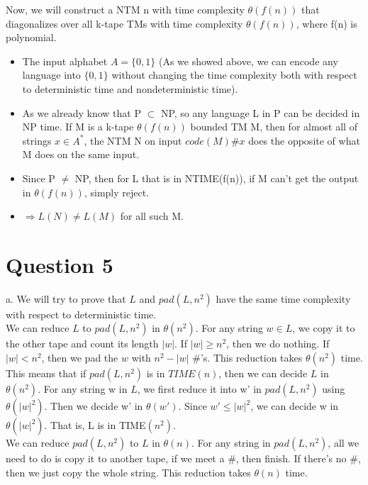\documentclass[12pt]{article}
\begin{document}
Now, we will construct a NTM n with time complexity $\theta (f(n))$ that
diagonalizes over all k-tape TMs with time complexity $\theta
(f(n))$, where f(n) is polynomial.

\begin{itemize}
\item The input alphabet $A = \{ 0,1 \}$ (As we showed above, we can
  encode any language into $\{ 0,1 \}$ without changing the time
  complexity both with respect to deterministic time and
  nondeterministic time).
\item As we already know that P $\subset$ NP, so any language L in P
  can be decided in NP time. If M is a k-tape $\theta (f(n))$ bounded
  TM M, then for almost all of strings $x \in A^*$, the NTM N on input
  $code(M)\#x$ does the opposite of what M does on the same input.
\item Since P $\ne$ NP, then for L that is in NTIME(f(n)), if M can't
  get the output in $\theta (f(n))$, simply reject.
\item $\Rightarrow L(N) \ne L(M)$ for all such M.
\end{itemize}

\section*{Question 5}

a. We will try to prove that $L$ and $pad(L, n^2)$ have the same time
complexity with respect to deterministic time. \\

We can reduce $L$ to $pad(L, n^2)$ in $\theta (n^2)$. For any string $w \in
L$, we copy it to the other tape and count its length $|w|$. If $|w|
\ge n^2$, then we do nothing. If $|w| < n^2$, then we pad the $w$ with
$n^2 - |w|$ $\#$'s. This reduction takes $\theta (n^2)$ time. \\

This means that if $pad(L, n^2)$ is in $TIME (n)$, then we can decide
$L$ in $\theta (n^2)$. For any string w in $L$, we first reduce it into
w' in $pad(L, n^2)$ using $\theta (|w|^2)$. Then we decide w' in
$\theta (w')$. Since $w' \le |w|^2$, we can decide w in
$\theta (|w|^2)$. That is, L is in TIME$(n^2)$. \\

We can reduce $pad(L, n^2)$ to $L$ in $\theta (n)$. For any string
in $pad(L, n^2)$, all we need to do is copy it to another tape, if we
meet a $\#$, then finish. If there's no $\#$, then we just copy the
whole string. This reduction takes $\theta (n)$ time. \\
\end{document}
